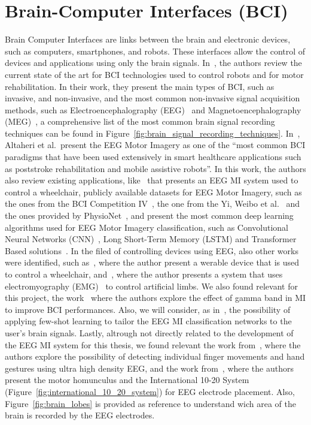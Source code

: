 \section{Brain-Computer Interfaces (BCI)}
Brain Computer Interfaces are links between the brain and electronic devices, such as computers, smartphones, and robots.
These interfaces allow the control of devices and applications using only the brain signals.
In~\cite{robinson2021emerging}, the authors review the current state of the art for BCI technologies used to control robots and for motor rehabilitation.
In their work, they present the main types of BCI, such as invasive, and non-invasive, and the most common non-invasive signal acquisition methods, such as Electroencephalography (EEG)~\cite{niedermeyer2005electroencephalography} and Magnetoencephalography (MEG)~\cite{singh2014magnetoencephalography}, a comprehensive list of the most common brain signal recording techniques can be found in Figure~\ref{fig:brain_signal_recording_techniques}.
In~\cite{altaheri_deep_2023}, Altaheri et al.\ present the EEG Motor Imagery as one of the ``most common BCI paradigms that have been used extensively in smart healthcare applications such as poststroke rehabilitation and mobile assistive robots''.
In this work, the authors also review existing applications, like~\cite{tang2020motor} that presents an EEG MI system used to control a wheelchair, publicly available datasets for EEG Motor Imagery, such as the ones from the BCI Competition IV~\cite{tangermann2012review}, the one from the Yi, Weibo et al.~\cite{yi2014evaluation} and the ones provided by PhysioNet~\cite{goldberger2000physiobank, schalk2004bci2000}, and present the most common deep learning algorithms used for EEG Motor Imagery classification, such as Convolutional Neural Networks (CNN)~\cite{lawhern2018eegnet}, Long Short-Term Memory (LSTM) and Transformer Based solutions~\cite{sharma_deep_2023}.
In the filed of controlling devices using EEG, also other works were identified, such as~\cite{10471624}, where the author present a werable device that is used to control a wheelchair, and~\cite{10453986}, where the author presents a system that uses electromyography (EMG)~\cite{mills2005basics} to control artificial limbs.
We also found relevant for this project, the work~\cite{ahn2013gamma} where the authors explore the effect of gamma band in MI to improve BCI performances.
Also, we will consider, as in~\cite{mammone2023few}, the possibility of applying few-shot learning to tailor the EEG MI classification networks to the user's brain signals.
Lastly, altrough not directly related to the development of the EEG MI system for this thesis, we found relevant the work from~\cite{10123901, lee2022individual}, where the authors explore the possibility of detecting individual finger movements and hand gestures using ultra high density EEG, and the work from~\cite{penfield1950cerebral, jasper1958ten}, where the authors present the motor homunculus and the International 10-20 System (Figure~\ref{fig:international_10_20_system}) for EEG electrode placement.
Also, Figure~\ref{fig:brain_lobes} is provided as reference to understand wich area of the brain is recorded by the EEG electrodes.

